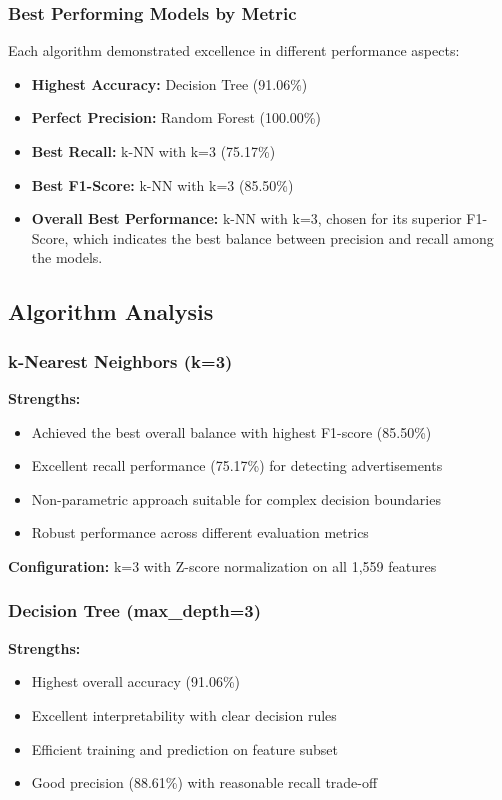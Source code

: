 \subsubsection{Best Performing Models by Metric}

Each algorithm demonstrated excellence in different performance aspects:

\begin{itemize}
    \item \textbf{Highest Accuracy:} Decision Tree (91.06\%)
    \item \textbf{Perfect Precision:} Random Forest (100.00\%)
    \item \textbf{Best Recall:} k-NN with k=3 (75.17\%)
    \item \textbf{Best F1-Score:} k-NN with k=3 (85.50\%)
    \item \textbf{Overall Best Performance:} k-NN with k=3, chosen for its superior F1-Score, which indicates the best balance between precision and recall among the models.
\end{itemize}

\subsection{Algorithm Analysis}

\subsubsection{k-Nearest Neighbors (k=3)}

\textbf{Strengths:}
\begin{itemize}
    \item Achieved the best overall balance with highest F1-score (85.50\%)
    \item Excellent recall performance (75.17\%) for detecting advertisements
    \item Non-parametric approach suitable for complex decision boundaries
    \item Robust performance across different evaluation metrics
\end{itemize}

\textbf{Configuration:} k=3 with Z-score normalization on all 1,559 features

\subsubsection{Decision Tree (max\_depth=3)}

\textbf{Strengths:}
\begin{itemize}
    \item Highest overall accuracy (91.06\%)
    \item Excellent interpretability with clear decision rules
    \item Efficient training and prediction on feature subset
    \item Good precision (88.61\%) with reasonable recall trade-off
\end{itemize}

